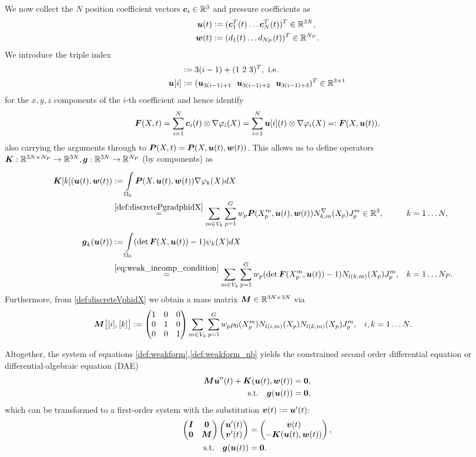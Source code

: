 We now collect the $N$ position coefficient vectors $\boldsymbol{c}_i \in\mathbb{R}^3$ and pressure coefficients as
\begin{align*}
	\boldsymbol{u}(t) &:= (\boldsymbol{c}_1^T(t) \ldots \boldsymbol{c}_N^T(t))^T \in\mathbb{R}^{3N},\\
	\boldsymbol{w}(t) &:= (d_1(t) \ldots d_{N_P}(t))^T \in\mathbb{R}^{N_P}.
\end{align*}
We introduce the triple index
\begin{align}
	[i] &:= 3(i-1)+(1~2~3)^T, \text{ i.e.}\\
	\vu[i] &:= (\vu_{3(i-1)+1}~~\vu_{3(i-1)+2}~~\vu_{3(i-1)+3})^T\in\R^{3\times 1}
\end{align}
for the $x,y,z$ components of the $i$-th coefficient and hence identify
\[
	\boldsymbol{F}(X,t) = \sum\limits_{i=1}^{N} \boldsymbol{c}_i(t)\otimes \nabla\varphi_i(X) = \sum\limits_{i=1}^{N} \boldsymbol{u}[i](t)\otimes \nabla\varphi_i(X) =: \boldsymbol{F}(X,\boldsymbol{u}(t)).
\]
also carrying the arguments through to $\boldsymbol{P}(X,t) = \boldsymbol{P}(X,\boldsymbol{u}(t),\boldsymbol{w}(t))$.
This allows us to define operators $\boldsymbol{K}: \mathbb{R}^{3N\times N_P}\to\mathbb{R}^{3N}, \boldsymbol{g}:\mathbb{R}^{3N}\to\mathbb{R}^{N_P}$ (by components) as
\begin{align}
	\vK[k](\vu(t),\vw(t)) &:= \intor\vP(X,\vu(t),\vw(t))\dpk dX\\
	&\re{def:discretePgradphidX} \sumvk\sumgp w_p\vP(\pmp,\vu(t),\vw(t))\dNkmp\jmp\in\R^3, && k=1\ldots N,\\
	\vg_k(\vu(t)) &:= \intor (\det\vF(X,\vu(t))-1)\psi_k(X)dX\\
	&\re{eq:weak_incomp_condition}\sumvk\sumgp w_p (\det\vF(\pmp,\vu(t))-1) \Nkmp\jmp, && k=1\ldots N_P.
\end{align}
Furthermore, from \eqref{def:discreteVphidX} we obtain a mass matrix $\boldsymbol{M}\in\mathbb{R}^{3N\times 3N}$ via
\begin{align*}
	\boldsymbol{M}\bigl[[i],[k]\bigr] &:= \left(\begin{matrix}1&0&0\\0&1&0\\0&0&1\end{matrix}\right) \sum\limits_{m\in V_k}^{}\sum\limits_{p=1}^{G} w_p \rho_0(X^m_p)N_{l(i,m)}(X_p) N_{l(k,m)}(X_p)J^m_p, && i,k=1\ldots N.
\end{align*}

Altogether, the system of equations \eqref{def:weakform},\eqref{def:weakform_nb} yields the constrained second order differential equation
or differential-algebraic equation (DAE)
\begin{align}
	\boldsymbol{M}\boldsymbol{u}''(t) + \boldsymbol{K}(\boldsymbol{u}(t),\boldsymbol{w}(t)) &= \boldsymbol{0},\\
		\text{s.t.}\quad \boldsymbol{g}(\boldsymbol{u}(t)) &= \boldsymbol{0},
\end{align}
which can be transformed to a first-order system with the substitution $\boldsymbol{v}(t) := \boldsymbol{u}'(t)$:
\begin{align}
	\left(\begin{matrix}\boldsymbol{I} & \boldsymbol{0}\\ \boldsymbol{0} & \boldsymbol{M}\end{matrix}\right)\left(\begin{matrix}\boldsymbol{u}'(t)\\ \boldsymbol{v}'(t)\end{matrix}\right) &= \left(\begin{matrix}\boldsymbol{v}(t) \\ -\boldsymbol{K}(\boldsymbol{u}(t),\boldsymbol{w}(t))\end{matrix}\right),\\
	\text{s.t.}\quad \boldsymbol{g}(\boldsymbol{u}(t))		&= \boldsymbol{0}.
\end{align}

